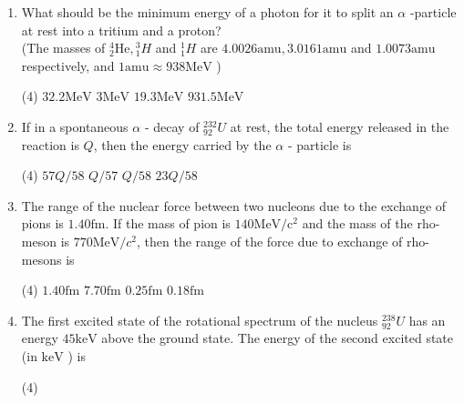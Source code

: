 \begin{enumerate}
	{}
	\begin{tasks}(4)
		\task[\textbf{A.}] $-1.913 \mu_{N}$
		\task[\textbf{B.}] $14.414 \mu_{N}$
		\task[\textbf{C.}] $4.793 \mu_{N}$
	\end{tasks}
	\item What should be the minimum energy of a photon for it to split an $\alpha$ -particle at rest into a tritium and a proton?\\
	(The masses of ${ }_{2}^{4} \mathrm{He},{ }_{1}^{3} H$ and ${ }_{1}^{1} H$ are $4.0026 \mathrm{amu}, 3.0161 \mathrm{amu}$ and $1.0073 \mathrm{amu}$ respectively, and $1 \mathrm{amu} \approx 938 \mathrm{MeV}$ )
	{	}
	\begin{tasks}(4)
		\task[\textbf{A.}] $32.2 \mathrm{MeV}$
		\task[\textbf{B.}] $3 \mathrm{MeV}$
		\task[\textbf{C.}] $19.3 \mathrm{MeV}$
		\task[\textbf{D.}] $931.5 \mathrm{MeV}$
	\end{tasks}
	\item 	If in a spontaneous $\alpha$ - decay of ${ }_{92}^{232} U$ at rest, the total energy released in the reaction is $Q$, then the energy carried by the $\alpha$ - particle is
	{}
	\begin{tasks}(4)
		\task[\textbf{A.}] $57 Q / 58$
		\task[\textbf{B.}]  $Q / 57$
		\task[\textbf{C.}] $Q / 58$
		\task[\textbf{D.}] $23 Q / 58$
	\end{tasks}
	\item The range of the nuclear force between two nucleons due to the exchange of pions is $1.40 \mathrm{fm}$. If the mass of pion is $140 \mathrm{MeV} / \mathrm{c}^{2}$ and the mass of the rho-meson is $770 \mathrm{MeV} / c^{2}$, then the range of the force due to exchange of rho-mesons is
	{	}
	\begin{tasks}(4)
		\task[\textbf{A.}] $1.40 \mathrm{fm}$
		\task[\textbf{B.}] $7.70 \mathrm{fm}$
		\task[\textbf{C.}] $0.25 \mathrm{fm}$
		\task[\textbf{D.}]  $0.18 \mathrm{fm}$
	\end{tasks}
	\item The first excited state of the rotational spectrum of the nucleus ${ }_{92}^{238} U$ has an energy $45 \mathrm{keV}$ above the ground state. The energy of the second excited state (in $\mathrm{keV}$ ) is
	{}
	\begin{tasks}(4)
	\end{tasks}

\end{enumerate}
